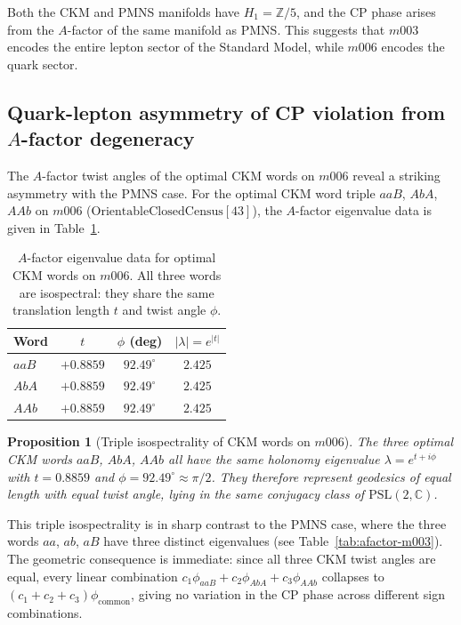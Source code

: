 \documentclass[11pt,a4paper]{article}
\newtheorem{proposition}{Proposition}
\begin{document}
Both the CKM and PMNS manifolds have $H_1 = \mathbb{Z}/5$, and the
CP phase arises from the $A$-factor of the same manifold as PMNS.
This suggests that $m003$ encodes the entire lepton sector of the
Standard Model, while $m006$ encodes the quark sector.

\subsection{Quark-lepton asymmetry of CP violation from $A$-factor degeneracy}
\label{subsec:asymmetry}

The $A$-factor twist angles of the optimal CKM words on $m006$ reveal
a striking asymmetry with the PMNS case.  For the optimal CKM word
triple $aaB$, $AbA$, $AAb$ on $m006$
($\mathrm{OrientableClosedCensus}[43]$), the $A$-factor eigenvalue
data is given in Table~\ref{tab:afactor-m006}.

\begin{table}[ht]
\caption{$A$-factor eigenvalue data for optimal CKM words on $m006$.
  All three words are isospectral: they share the same translation
  length $t$ and twist angle $\phi$.}
\label{tab:afactor-m006}
\centering
\begin{tabular}{lccc}
\toprule
Word & $t$ & $\phi$ (deg) & $|\lambda| = e^{|t|}$ \\
\midrule
$aaB$ & $+0.8859$ & $92.49^\circ$ & $2.425$ \\
$AbA$ & $+0.8859$ & $92.49^\circ$ & $2.425$ \\
$AAb$ & $+0.8859$ & $92.49^\circ$ & $2.425$ \\
\bottomrule
\end{tabular}
\end{table}

\begin{proposition}[Triple isospectrality of CKM words on $m006$]
\label{prop:triple}
The three optimal CKM words $aaB$, $AbA$, $AAb$ all have the same
holonomy eigenvalue $\lambda = e^{t+i\phi}$ with $t = 0.8859$ and
$\phi = 92.49^\circ \approx \pi/2$.  They therefore represent
geodesics of equal length with equal twist angle, lying in the same
conjugacy class of $\mathrm{PSL}(2,\mathbb{C})$.
\end{proposition}

This triple isospectrality is in sharp contrast to the PMNS case,
where the three words $aa$, $ab$, $aB$ have three distinct
eigenvalues (see Table~\ref{tab:afactor-m003}).  The geometric
consequence is immediate: since all three CKM twist angles are equal,
every linear combination
$c_1\phi_{aaB} + c_2\phi_{AbA} + c_3\phi_{AAb}$
collapses to $(c_1 + c_2 + c_3)\phi_{\mathrm{common}}$, giving no
variation in the CP phase across different sign combinations.
\end{document}
